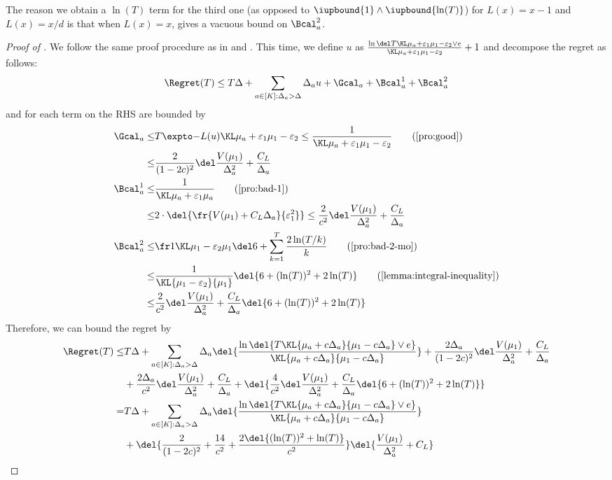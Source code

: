 \begin{remark}
The reason we obtain a $\ln(T)$ term for the third one (as opposed to $\iupbound{1} \wedge \iupbound{\ln(T)}$) for $L(x) = x-1$ and $L(x) = x / d$ is that when $L(x) = x$,  gives a vacuous bound on $\Bcal_a^2$.
\end{remark}


\begin{proof}[Proof of ]
We follow the same proof procedure as in  and . This time, we define $u$ as $\expDefU + 1$ and decompose the regret as follows:
    \[
        \Regret(T) \leq T\Delta + \sum_{a\in[K]: \Delta_a > \Delta} \Delta_a u + \Gcal_a + \Bcal^1_a + \Bcal^2_a
    \]
and for each term on the RHS are bounded by
    \begin{align*}
        \Gcal_a 
        \leq& \ExpFOne \leq \GoodEventBound 
                \tag{\Cref{pro:good}}
        \\
        \leq& \frac{2}{(1-2c)^2}\CommonFactorInRegretBound
        \\
        \Bcal_a^1 
        \leq& \ExpFTwo
                \tag{\Cref{pro:bad-1}}
        \\
        \leq& 2 \cdot \del{\fr {V(\mu_1)+C_L\Delta_a}{\varepsilon_1^2}}
        \leq
        \frac{2}{c^2} \CommonFactorInRegretBound
        \\
        \Bcal_a^2
        \leq& \IdentityLBadCaseTwoMO
            \tag{\Cref{pro:bad-2-mo}}
        \\
        \leq&
        \frac{1}{\KL{\mu_1-\varepsilon_2}{\mu_1}} \del{6 + (\ln(T))^2 + 2\ln(T)}
            \tag{\Cref{lemma:integral-inequality}}
        \\
        \leq&
            \frac{2}{c^2} \CommonFactorInRegretBound \del{6 + (\ln(T))^2 + 2\ln(T)}
    \end{align*}
Therefore, we can bound the regret by
    \begin{align*}
        \Regret(T) 
        \leq& 
        T \Delta + \sum_{a\in[K]: \Delta_a > \Delta} \Delta_a \del{\frac{\ln\del{T\KL{\mu_a+c\Delta_a}{\mu_1-c\Delta_a} \vee e}}{\KL{\mu_a+c\Delta_a}{\mu_1-c\Delta_a}}} +
        \frac{2\Delta_a}{(1-2c)^2}\CommonFactorInRegretBound
        \\
        &+
        \frac{2\Delta_a}{c^2} \CommonFactorInRegretBound +
        \del{\frac{4}{c^2} \CommonFactorInRegretBound \del{6 + (\ln(T))^2 + 2\ln(T)}}
        \\
        =&
        T \Delta + \sum_{a\in[K]: \Delta_a > \Delta} \Delta_a \del{\frac{\ln\del{T\KL{\mu_a+c\Delta_a}{\mu_1-c\Delta_a} \vee e}}{\KL{\mu_a+c\Delta_a}{\mu_1-c\Delta_a}}}
        \\
        &+ 
        \del{\frac{2}{(1-2c)^2} + \frac{14}{c^2} + \frac{2\del{(\ln(T))^2+\ln(T)}}{c^2}} \del{\frac{V(\mu_1)}{\Delta_a^2} + C_L} 
    \end{align*}

\end{proof}

